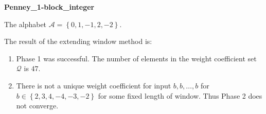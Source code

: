 \begin{exmp}
\textbf{ Penney\_1-block\_integer }

\label{ex:Penney1-blockinteger}

The alphabet $\mathcal{A} =\left\{0, 1, -1, 2, -2\right\}$.

The result of the extending window method is:
\begin{enumerate}
    \item Phase 1 was successful.
The number of elements in the weight coefficient set $\mathcal{Q}$ is $47$.

    \item There is not a unique weight coefficient for input $b,b,\dots,b$ for $b\in\left\{2, 3, 4, -4, -3, -2\right\}$ for some fixed length of window. Thus Phase 2 does not converge.

\end{enumerate}
\end{exmp}
